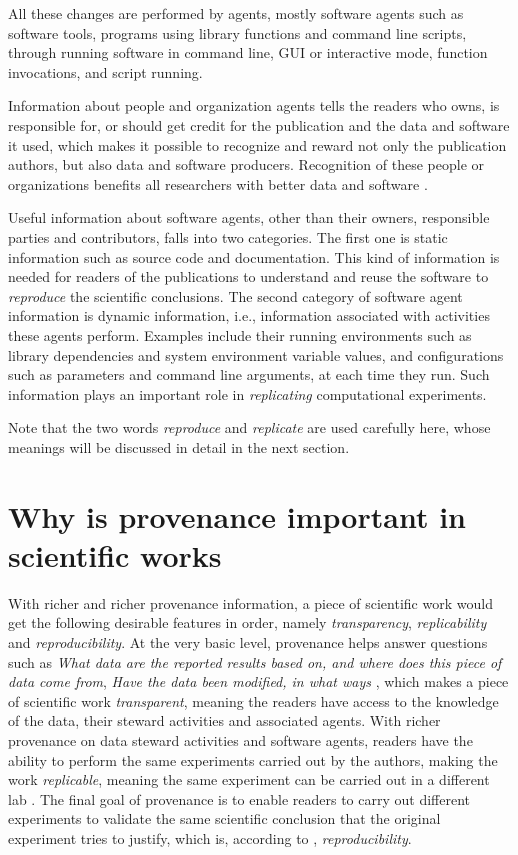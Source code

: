 All these changes are performed by agents, mostly software agents such as software tools, programs using library functions and command line scripts, through running software in command line, GUI or interactive mode, function invocations, and script running.

Information about people and organization agents tells the readers who owns, is responsible for, or should get credit for the publication and the data and software it used, which makes it possible to recognize and reward not only the publication authors, but also data and software producers. Recognition of these people or organizations benefits all researchers with better data and software \cite{parsons2010data, goble2014better}. 

Useful information about software agents, other than their owners, responsible parties and contributors, falls into two categories. The first one is static information such as source code and documentation. This kind of information is needed for readers of the publications to understand and reuse the software to \emph{reproduce} the scientific conclusions. The second category of software agent information is dynamic information, i.e., information associated with activities these agents perform. Examples include their running environments such as library dependencies and system environment variable values, and configurations such as parameters and command line arguments, at each time they run. Such information plays an important role in \emph{replicating} computational experiments.

Note that the two words \emph{reproduce} and \emph{replicate} are used carefully here, whose meanings will be discussed in detail in the next section.


\section{Why is provenance important in scientific works}
With richer and richer provenance information, a piece of scientific work would get the following desirable features in order, namely \emph{transparency}, \emph{replicability} and \emph{reproducibility}. At the very basic level, provenance helps answer questions such as \emph{What data are the reported results based on, and where does this piece of data come from}, \emph{Have the data been modified, in what ways} \cite{davidson2008provenance}, which makes a piece of scientific work \emph{transparent}, meaning the readers have access to the knowledge of the data, their steward activities and associated agents.  With richer provenance on data steward activities and software agents, readers have the ability to perform the same experiments carried out by the authors, making the work \emph{replicable}, meaning the same experiment can be carried out in a different lab . The final goal of provenance is to enable readers to carry out different experiments to validate the same scientific conclusion that the original experiment tries to justify, which is, according to \cite{drummond2009replicability}, \emph{reproducibility}.

